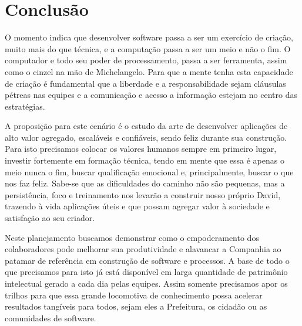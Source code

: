 \chapter{Conclusão}

O momento indica que desenvolver software passa a ser um exercício de criação, muito mais do que técnica, e a computação passa a ser um meio e não o fim. O computador e todo seu poder de processamento, passa a ser ferramenta, assim como o cinzel na mão de Michelangelo. Para que a mente tenha esta capacidade de criação é fundamental que a liberdade e a responsabilidade sejam cláusulas pétreas nas equipes e a comunicação e acesso a informação estejam no centro das estratégias.

A proposição para este cenário é o estudo da arte de desenvolver aplicações de alto valor agregado, escaláveis e confiáveis, sendo feliz durante sua construção. Para isto precisamos colocar os valores humanos sempre em primeiro lugar, investir fortemente em formação técnica, tendo em mente que essa é apenas o meio nunca o fim, buscar qualificação emocional e, principalmente, buscar o  que nos faz feliz. Sabe-se que as dificuldades do caminho não são pequenas, mas a persistência, foco e treinamento nos levarão a construir nosso próprio David, trazendo à vida aplicações úteis e que possam agregar valor à sociedade e satisfação ao seu criador.

Neste planejamento buscamos demonstrar como o empoderamento dos colaboradores pode melhorar sua produtividade e alavancar a Companhia ao patamar de referência em construção de software e processos. A base de todo o que precisamos para isto já está disponível em larga quantidade de patrimônio intelectual gerado a cada dia pelas equipes. Assim somente precisamos apor os trilhos para que essa grande locomotiva de conhecimento possa acelerar resultados tangíveis para todos, sejam eles a Prefeitura, os cidadão ou as comunidades de software.
